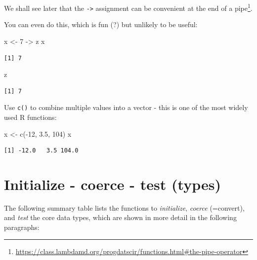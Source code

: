 \documentclass[
]{book}
\newenvironment{Shaded}{\begin{snugshade}}{\end{snugshade}}
\newcommand{\DecValTok}[1]{\textcolor[rgb]{0.00,0.00,0.81}{#1}}
\newcommand{\FloatTok}[1]{\textcolor[rgb]{0.00,0.00,0.81}{#1}}
\newcommand{\FunctionTok}[1]{\textcolor[rgb]{0.00,0.00,0.00}{#1}}
\newcommand{\NormalTok}[1]{#1}
\newcommand{\OtherTok}[1]{\textcolor[rgb]{0.56,0.35,0.01}{#1}}
\newcommand{\SpecialCharTok}[1]{\textcolor[rgb]{0.00,0.00,0.00}{#1}}
\DeclareRobustCommand{\href}[2]{#2\footnote{\url{#1}}}
\begin{document}
We shall see later that the \texttt{-\textgreater{}} assignment can be convenient at the end of a \href{https://class.lambdamd.org/progdatscir/functions.html\#the-pipe-operator}{pipe}.

You can even do this, which is fun (?) but unlikely to be useful:

\begin{Shaded}
\begin{Highlighting}[]
\NormalTok{x }\OtherTok{\textless{}{-}} \DecValTok{7} \OtherTok{{-}\textgreater{}}\NormalTok{ z}
\NormalTok{x}
\end{Highlighting}
\end{Shaded}

\begin{verbatim}
[1] 7
\end{verbatim}

\begin{Shaded}
\begin{Highlighting}[]
\NormalTok{z}
\end{Highlighting}
\end{Shaded}

\begin{verbatim}
[1] 7
\end{verbatim}

Use \texttt{c()} to combine multiple values into a vector - this is one of the most widely used R functions:

\begin{Shaded}
\begin{Highlighting}[]
\NormalTok{x }\OtherTok{\textless{}{-}} \FunctionTok{c}\NormalTok{(}\SpecialCharTok{{-}}\DecValTok{12}\NormalTok{, }\FloatTok{3.5}\NormalTok{, }\DecValTok{104}\NormalTok{)}
\NormalTok{x}
\end{Highlighting}
\end{Shaded}

\begin{verbatim}
[1] -12.0   3.5 104.0
\end{verbatim}

\hypertarget{initialize---coerce---test-types}{%
\section{Initialize - coerce - test (types)}\label{initialize---coerce---test-types}}

The following summary table lists the functions to \emph{initialize}, \emph{coerce} (=convert), and \emph{test} the core data types, which are shown in more detail in the following paragraphs:
\end{document}
